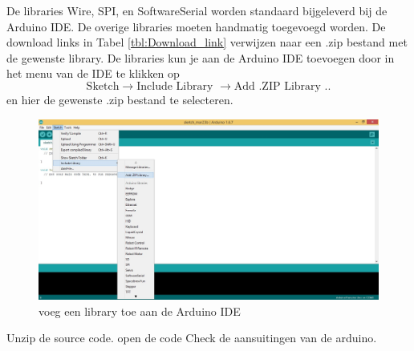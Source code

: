 \documentclass[12pt,a4paper]{article}
\begin{document}
De libraries Wire, SPI, en SoftwareSerial worden standaard bijgeleverd bij de Arduino IDE. De overige libraries moeten handmatig toegevoegd worden. De download links in Tabel \ref{tbl:Download_link} verwijzen naar een .zip bestand met de gewenste library. De libraries kun je aan de Arduino IDE toevoegen door in het menu van de IDE te klikken op $$ \text{Sketch} \rightarrow \text{Include Library }\rightarrow \text{Add .ZIP Library ..}$$ en hier de gewenste .zip bestand te selecteren.
\begin{figure}[h]
\centering
\includegraphics[width=0.7\linewidth]{Add_ZIP}
\caption{voeg een library toe aan de Arduino IDE}
\label{fig:Add_ZIP}
\end{figure}

Unzip de source code. 
open de code
Check de aansuitingen van de arduino.
\end{document}
